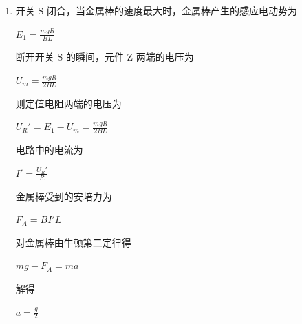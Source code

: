 \documentclass[\gkver]{gaokaozhenti}
\begin{document}
\begin{enumerate}
{\begin{enumerate}
	$I_{2}=\frac{U_{R}}{R}$

	解得

	$v_{2}=\frac{3mgR}{2B^{2}L^{2}}$

	\item
	开关 S 闭合，当金属棒的速度最大时，金属棒产生的感应电动势为

	$E_{1}=\frac{mgR}{BL}$

	断开开关 S 的瞬间，元件 Z 两端的电压为

	$U_{m}=\frac{mgR}{2BL}$

	则定值电阻两端的电压为

	$U_{R}'=E_{1}-U_{m}=\frac{mgR}{2BL}$

	电路中的电流为

	$I'=\frac{U_{R}'}{R}$

	金属棒受到的安培力为

	$F_{A}=BI'L$

	对金属棒由牛顿第二定律得

	$mg-F_{A}=ma$

	解得

	$a=\frac{g}{2}$
\end{enumerate}
}

\end{enumerate}
\end{document}
